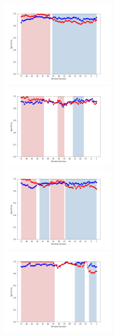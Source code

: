 \documentclass[submit]{ipsj}
\begin{document}
\begin{figure}[t]
\begin{minipage}{\textwidth}
\vspace{0.08\textheight}
\begin{center}
    \includegraphics[width=0.495\textwidth]{Uenaka_fig/RQ2_result/Nova/Nova_merge_Specificity.pdf}
    \includegraphics[width=0.495\textwidth]{Uenaka_fig/RQ2_result/Neutron/Neutron_merge_Specificity.pdf}
    \includegraphics[width=0.495\textwidth]{Uenaka_fig/RQ2_result/Cinder/Cinder_merge_Specificity.pdf}
    \includegraphics[width=0.495\textwidth]{Uenaka_fig/RQ2_result/Keystone/Keystone_merge_Specificity.pdf}

\end{center}
\end{minipage}
\end{figure}
\end{document}
